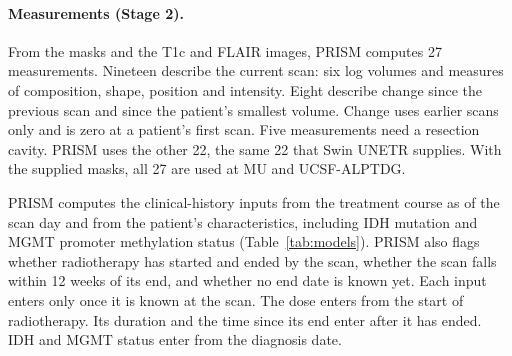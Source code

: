 \documentclass[largeformat]{interact} %
\begin{document}
\paragraph*{Measurements (Stage 2).} From the masks and the T1c and FLAIR images, PRISM computes 27
measurements. Nineteen describe the current scan: six log volumes and measures of composition,
shape, position and intensity. Eight describe change since the previous scan and since the patient's smallest volume.
Change uses earlier scans only and is zero at a patient's first scan. Five measurements need a resection cavity.
PRISM uses the other 22, the same 22 that Swin UNETR supplies. With the supplied masks, all 27 are used at MU and UCSF-ALPTDG.

PRISM computes the clinical-history inputs from the treatment course as of the scan day and from the patient's
characteristics, including IDH mutation and MGMT promoter methylation status (Table~\ref{tab:models}). PRISM also flags whether radiotherapy has started and ended by
the scan, whether the scan falls within 12 weeks of its end, and whether no end date is known yet. Each input enters only once it is known at the scan. The dose enters
from the start of radiotherapy. Its duration and the time since its end enter after it has ended. IDH and MGMT status
enter from the diagnosis date.
\end{document}
